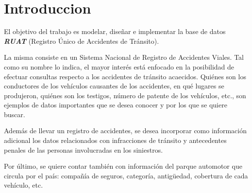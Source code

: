 \section{Introduccion}

El objetivo del trabajo es modelar, dise\~nar e implementar la base de datos \textbf{\emph{RUAT}}
(Registro Único de Accidentes de Tránsito).

La misma consiste en un Sistema Nacional de Registro de Accidentes Viales. Tal como su nombre lo indica, el mayor interés
está enfocado en la posibilidad de efectuar consultas respecto a los accidentes de tránsito acaecidos. Quiénes son los
conductores de los vehículos causantes de los accidentes, en qué lugares se produjeron, quiénes son los testigos,
número de patente de los vehículos, etc., son ejemplos de datos importantes
que se desea conocer y por los que se quiere buscar.

Además de llevar un registro de accidentes, se desea incorporar como información adicional los datos relacionados con
infracciones de tránsito y antecedentes penales de las personas involucradas en los siniestros.

Por último, se quiere contar también con información del parque automotor que circula por el país: compa\~nía de seguros,
categoría, antigüedad, cobertura de cada vehículo, etc.
